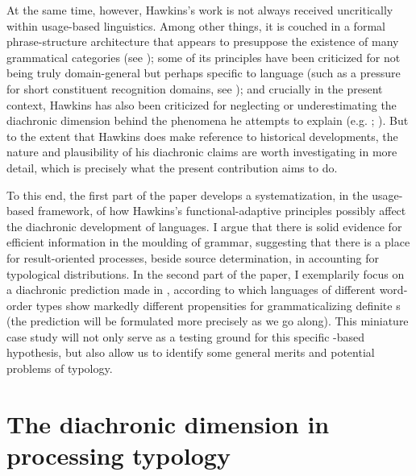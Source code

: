 \documentclass[output=paper]{langsci/langscibook}
\begin{document}
At the same time, however, Hawkins’s work is not always received uncritically within usage-based linguistics. Among other things, it is couched in a formal phrase-structure architecture that appears to presuppose the existence of many grammatical categories (see \citealt{Diessel2016_Corr}); some of its principles have been criticized for not being truly domain-general but perhaps specific to language (such as a pressure for short constituent recognition domains, see \citealt{Bybee2010_Cogn}); and crucially in the present context, Hawkins has also been criticized for neglecting or underestimating the diachronic dimension behind the phenomena he attempts to explain (e.g. \citealt{Cristofaro2017_Dep}; ). But to the extent that Hawkins does make reference to historical developments, the nature and plausibility of his diachronic claims are worth investigating in more detail, which is precisely what the present contribution aims to do. 

To this end, the first part of the paper develops a systematization, in the usage-based framework, of how Hawkins’s functional-adaptive principles possibly affect the diachronic development of languages. I argue that there is solid evidence for efficient information  in the moulding of grammar, suggesting that there is a place for result-oriented processes, beside source determination, in accounting for typological distributions. In the second part of the paper, I exemplarily focus on a diachronic prediction made in \citet{Hawkins2014_VarEff}, according to which languages of different word-order types show markedly different propensities for grammaticalizing definite s (the prediction will be formulated more precisely as we go along). This miniature case study will not only serve as a testing ground for this specific -based hypothesis, but also allow us to identify some general merits and potential problems of  typology.

\section{The diachronic dimension in processing typology} 
\end{document}

